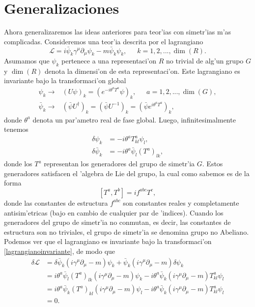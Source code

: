 \section{Generalizaciones}
Ahora generalizaremos las ideas anteriores para teor'ias con simetr'ias m'as complicadas. Consideremos una teor'ia descrita por el lagrangiano
\begin{equation}
\mathcal{L}=i\bar{\psi}_k\gamma^\mu\partial_\mu \psi_k-m\bar{\psi}_k\psi_k,\,\,\, \quad k=1,2,...,\dim (R).
\end{equation}
Asumamos que $\psi_k$ pertenece a una representaci'on $R$ no trivial de alg'un grupo $G$ y $\dim (R)$ denota la dimensi'on de esta representaci'on. Este lagrangiano es invariante bajo la transformaci'on global
\begin{equation}
\begin{aligned}
\psi_k \rightarrow &(U\psi)_k =\left(e^{-i\theta^a T^a}\psi\right)_k,\,\,\, \quad a=1,2,...,\dim (G), \\
\bar{\psi}_k \rightarrow & (\bar{\psi}U^\dagger )_k=(\bar{\psi} U^{-1})_k=\left(\bar{\psi}e^{i\theta^a T^a}\right)_k,
\end{aligned}
\end{equation} 
donde $\theta^a$ denota un par'ametro real de fase global. Luego, infinitesimalmente tenemos
\begin{equation}
\begin{aligned} \label{lagrangianoinvariante}
\delta \psi_k &= -i\theta^a T^{a}_{kl} \psi_l, \\
\delta \bar{\psi}_k &= -i\theta^a \bar{\psi}_l (T^{a})_{lk},
\end{aligned}
\end{equation}
donde los $T^a$ representan los generadores del grupo de simetr'ia $G$. Estos generadores satisfacen el 'algebra de Lie del grupo, la cual como sabemos es de la forma
\begin{equation} \label{algebradelie}
[T^a,T^b]=if^{abc}T^c,
\end{equation}
donde las constantes de estructura $f^{abc}$ son constantes reales y completamente antisim'etricas (bajo en cambio de cualquier par de 'indices). Cuando los generadores del grupo de simetr'ia no conmutan, es decir, las constantes de estructura son no triviales, el grupo de simetr'ia se denomina grupo no Abeliano. Podemos ver que el lagrangiano es invariante bajo la transformaci'on \eqref{lagrangianoinvariante}, de modo que
\begin{equation}
\begin{aligned}
\delta\mathcal{L}&=\delta\bar{\psi}_k(i\gamma^\mu \partial_\mu-m)\psi_k+\bar{\psi}_k(i\gamma^\mu\partial_\mu-m)\delta \psi_k \\
&=i\theta^a \bar{\psi} _l (T^a)_{lk}(i\gamma^\mu \partial_\mu-m)\psi_k-i\theta^a \bar{\psi}_k(i\gamma^\mu \partial _\mu-m)T^a_{kl}\psi_l \\
&=i\theta^a \bar{\psi}_k(T^a)_{kl}(i\gamma^\mu \partial_\mu-m)\psi_l-i\theta^a \bar{\psi}_k(i\gamma^\mu \partial_\mu -m) T^a_{kl}\psi_l \\
&=0.
\end{aligned}
\end{equation}
